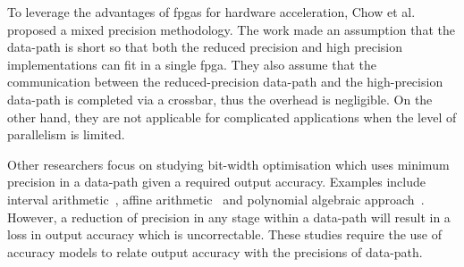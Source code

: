 
To leverage the advantages of \gls{fpga}s for hardware acceleration, Chow et al.~\cite{chow11} proposed a mixed precision methodology.
The work made an assumption that the data-path is short so that both the reduced precision and high precision implementations can fit in a single \gls{fpga}.
They also assume that the communication between the reduced-precision data-path and the high-precision data-path is completed via a crossbar, thus the overhead is negligible. 
On the other hand, they are not applicable for complicated applications when the level of parallelism is limited.

Other researchers focus on studying bit-width optimisation which uses minimum precision in a data-path given a required output accuracy.
Examples include interval arithmetic~\cite{fang03}, affine arithmetic~\cite{lee05,osborne07} and polynomial algebraic approach~\cite{boland10}.
However, a reduction of precision in any stage within a data-path will result in a loss in output accuracy which is uncorrectable.
These studies require the use of accuracy models to relate output accuracy with the precisions of data-path.

